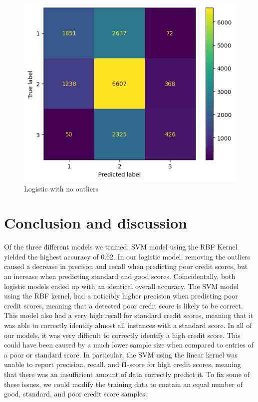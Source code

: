 \documentclass[twocolumn]{article}
\begin{document}
\begin{figure}
    \centering
    \includegraphics[width=0.65\columnwidth]{logisticNoOutliers.png}
    \caption{Logistic with no outliers}
\end{figure}

\clearpage
\section*{Conclusion and discussion}
Of the three different models we trained, SVM model using the RBF Kernel yielded the highest
accuracy of 0.62. In our logistic model, removing the outliers caused a decrease in precison
and recall when predicting poor credit scores, but an increase when predicting standard and good
scores. Coincidentally, both logistic models ended up with an identical overall accuracy.
\vspace{5mm}\newline
The SVM model using the RBF kernel, had a noticibly higher precision when predicting poor credit
scores, meaning that a detected poor credit score is likely to be correct. This model also had a
very high recall for standard credit scores, meaning that it was able to correctly identify almost all
instances with a standard score.
\vspace{5mm}\newline
In all of our models, it was very difficult to correctly identify a high credit score. This could have
been caused by a much lower sample size when compared to entries of a poor or standard score. In particular,
the SVM using the linear kernel was unable to report precision, recall, and f1-score for high credit scores,
meaning that there was an insufficient amount of data correctly predict it. To fix some of these issues,
we could modify the training data to contain an equal number of good, standard, and poor credit score samples. 
\end{document}
